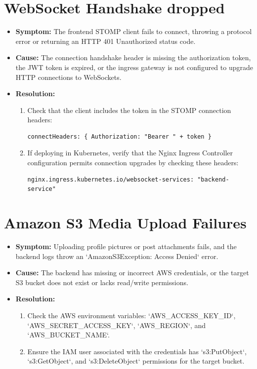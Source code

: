 \section{WebSocket Handshake dropped}
\begin{itemize}
    \item \textbf{Symptom:} The frontend STOMP client fails to connect, throwing a protocol error or returning an HTTP 401 Unauthorized status code.
    \item \textbf{Cause:} The connection handshake header is missing the authorization token, the JWT token is expired, or the ingress gateway is not configured to upgrade HTTP connections to WebSockets.
    \item \textbf{Resolution:}
    \begin{enumerate}
        \item Check that the client includes the token in the STOMP connection headers:
        \begin{lstlisting}[language={}]
        connectHeaders: { Authorization: "Bearer " + token }
        \end{lstlisting}
        \item If deploying in Kubernetes, verify that the Nginx Ingress Controller configuration permits connection upgrades by checking these headers:
        \begin{lstlisting}[language={}]
        nginx.ingress.kubernetes.io/websocket-services: "backend-service"
        \end{lstlisting}
    \end{enumerate}
\end{itemize}

\section{Amazon S3 Media Upload Failures}
\begin{itemize}
    \item \textbf{Symptom:} Uploading profile pictures or post attachments fails, and the backend logs throw an `AmazonS3Exception: Access Denied` error.
    \item \textbf{Cause:} The backend has missing or incorrect AWS credentials, or the target S3 bucket does not exist or lacks read/write permissions.
    \item \textbf{Resolution:}
    \begin{enumerate}
        \item Check the AWS environment variables: `AWS\_ACCESS\_KEY\_ID`, `AWS\_SECRET\_ACCESS\_KEY`, `AWS\_REGION`, and `AWS\_BUCKET\_NAME`.
        \item Ensure the IAM user associated with the credentials has `s3:PutObject`, `s3:GetObject`, and `s3:DeleteObject` permissions for the target bucket.
    \end{enumerate}
\end{itemize}
